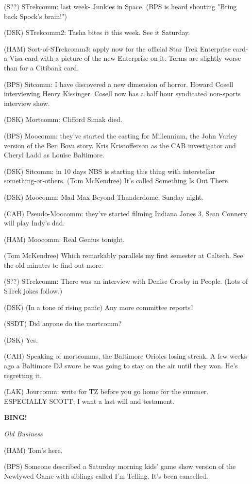 \documentclass[12pt]{article}
\newcommand{\bing}{{\bf BING!} }
\newcommand{\goto}[1]{\bing \vskip 12pt \centerline{{\em{#1}}}}
\begin{document}
(S??) STrekcomm: last week- Junkies in Space. (BPS is heard shouting "Bring back Spock's brain!")

(DSK) STrekcomm2: Tasha bites it this week. See it Saturday.

(HAM) Sort-of-STrekcomm3: apply now for the official Star Trek Enterprise card- a Visa card with a picture of the new Enterprise on it. Terms are slightly worse than for a Citibank card.

(BPS) Sitcomm: I have discovered a new dimension of horror. Howard Cosell interviewing Henry Kissinger. Cosell now has a half hour syndicated non-sports interview show.

(DSK) Mortcomm: Clifford Simak died.

(BPS) Moocomm: they've started the casting for Millennium, the John Varley version of the Ben Bova story. Kris Kristofferson as the CAB investigator and Cheryl Ladd as Louise Baltimore.

(DSK) Sitcomm: in 10 days NBS is starting this thing with interstellar something-or-others. (Tom McKendree) It's called Something Is Out There.

(DSK) Moocomm: Mad Max Beyond Thunderdome, Sunday night.

(CAH) Pseudo-Moocomm: they've started filming Indiana Jones 3. Sean Connery will play Indy's dad.

(HAM) Moocomm: Real Genius tonight.

(Tom McKendree) Which remarkably parallels my first semester at Caltech. See the old minutes to find out more.

(S??) STrekcomm: There was an interview with Denise Crosby in People. (Lots of STrek jokes follow.)

(DSK) (In a tone of rising panic) Any more committee reports?

(SSDT) Did anyone do the mortcomm?

(DSK) Yes.

(CAH) Speaking of mortcomms, the Baltimore Orioles losing streak. A few weeks ago a Baltimore DJ swore he was going to stay on the air until they won. He's regretting it.

(LAK) Jourcomm: write for TZ before you go home for the summer. ESPECIALLY SCOTT; I want a last will and testament.

\goto{Old Business}

(HAM) Tom's here.

(BPS) Someone described a Saturday morning kids' game show version of the Newlywed Game with siblings called I'm Telling. It's been cancelled.
\end{document}
